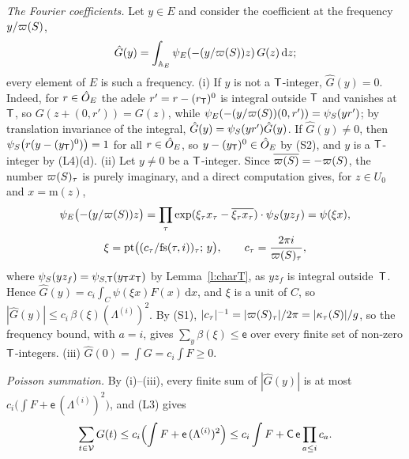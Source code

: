 \documentclass[11pt,a4paper]{article}
\makeatletter
\theoremstyle{plainx}
\theoremstyle{uprightx}
\renewenvironment{proof}[1][Proof]{\par\pushQED{\qed}\normalfont\topsep0pt\partopsep0pt
  \trivlist\item[\hskip\labelsep\itshape #1.]\ignorespaces}{\popQED\endtrivlist\@endpefalse}
\newcommand{\dd}{\mathrm{d}}
\newcommand{\Inp}[1]{\textup{(#1)}}
\makeatother
\begin{document}
\begin{proof}[Proof of Theorem C]
\emph{The Fourier coefficients.} Let $y\in E$ and consider the coefficient at the frequency $y/\varpi(S)$,
\[\hat G(y)=\int_{\AdE}\psi_E(-(y/\vpS{S})z)\,G(z)\,\dd z;\]
every element of $E$ is such a frequency. (i) If $y$ is not a $\mathsf{T}$-integer, $\hat G(y)=0$. Indeed, for $r\in\hat{O}_E$ the adele
$r'=r-(r_{\mathsf{T}})^{0}$ is integral outside $\mathsf{T}$ and vanishes at~$\mathsf{T}$, so $G(z+(0,r'))=G(z)$, while
$\psi_E(-(y/\varpi(S))(0,r'))=\psi_{S}(yr')$; by translation invariance of the integral, $\hat G(y)=\psi_{S}(yr')\hat G(y)$.
If $\hat G(y)\ne0$, then $\psi_{S}\bigl(r(y-(y_{\mathsf{T}})^{0})\bigr)=1$ for all $r\in\hat{O}_E$, so $y-(y_{\mathsf{T}})^{0}\in\hat{O}_E$ by
\Inp{S2}, and $y$ is a $\mathsf{T}$-integer by \Inp{L4}(d). (ii) Let $y\ne0$ be a $\mathsf{T}$-integer. Since
$\overline{\varpi(S)}=-\varpi(S)$, the number $\varpi(S)_\tau$ is purely imaginary, and a direct computation gives, for
$z\in U_0$ and $x=\mathrm{m}(z)$,
\begin{gather*}\psi_E\bigl(-(y/\varpi(S))z\bigr)=\prod_\tau\exp(\xi_\tau x_\tau-\overline{\xi_\tau x_\tau})\cdot\psi_{S}(yz_f)=\psi(\xi x),\\
\xi=\mathrm{pt}\bigl((c_\tau/\mathrm{fs}(\tau,i))_\tau;\,y\bigr),\qquad c_\tau=\frac{2\pi i}{\varpi(S)_\tau},\end{gather*}
where $\psi_{S}(yz_f)=\psi_{S,\mathsf{T}}(y_{\mathsf{T}}x_{\mathsf{T}})$ by Lemma~\ref{l:charT}, as $yz_f$ is integral outside~$\mathsf{T}$.
Hence $\hat G(y)=c_i\int_C\psi(\xi x)F(x)\,\dd x$, and $\xi$ is a unit of $C$, so
$|\hat G(y)|\le c_i\,\beta(\xi)(\Lambda^{(i)})^{2}$. By \Inp{S1}, $|c_\tau|^{-1}=|\varpi(S)_\tau|/2\pi=|\kappa_{\tau}(S)|/g$,
so the frequency bound, with $a=i$, gives $\sum_{y}\beta(\xi)\le\mathsf{e}$ over every finite set of non-zero
$\mathsf{T}$-integers. (iii) $\hat G(0)=\int G=c_i\int F\ge0$.

\emph{Poisson summation.} By (i)--(iii), every finite sum of $|\hat G(y)|$ is at most
$c_i\bigl(\int F+\mathsf{e}\,(\Lambda^{(i)})^{2}\bigr)$, and \Inp{L3} gives
\begin{equation}\label{e:poisson}
\sum_{t\in\mathcal{V}}G(t)\le c_i\Bigl(\int F+\mathsf{e}\,(\Lambda^{(i)})^{2}\Bigr)\le c_i\int F+\mathsf{C}\,\mathsf{e}\prod_{a\le i}c_a .
\end{equation}


\end{proof}
\end{document}
